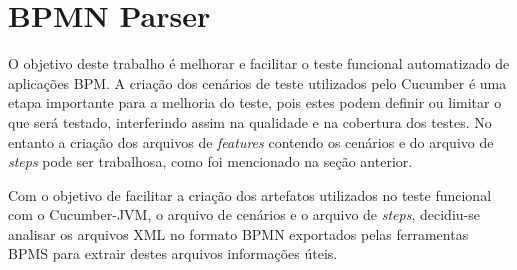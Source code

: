 \documentclass[12pt]{article}
\begin{document}

\section{BPMN Parser}
O objetivo deste trabalho é melhorar e facilitar o teste funcional automatizado de aplicações BPM. A criação dos cenários de teste utilizados pelo Cucumber é uma etapa importante para a melhoria do teste, pois estes podem definir ou limitar o que será testado, interferindo assim na qualidade e na cobertura dos testes. No entanto a criação dos arquivos de \emph{features} contendo os cenários e do arquivo de \emph{steps} pode ser trabalhosa, como foi mencionado na seção anterior.

Com o objetivo de facilitar a criação dos artefatos utilizados no teste funcional com o Cucumber-JVM, o arquivo de cenários e o arquivo de \emph{steps}, decidiu-se analisar os arquivos XML no formato BPMN exportados pelas ferramentas BPMS para extrair destes arquivos informações úteis. 
\end{document}
